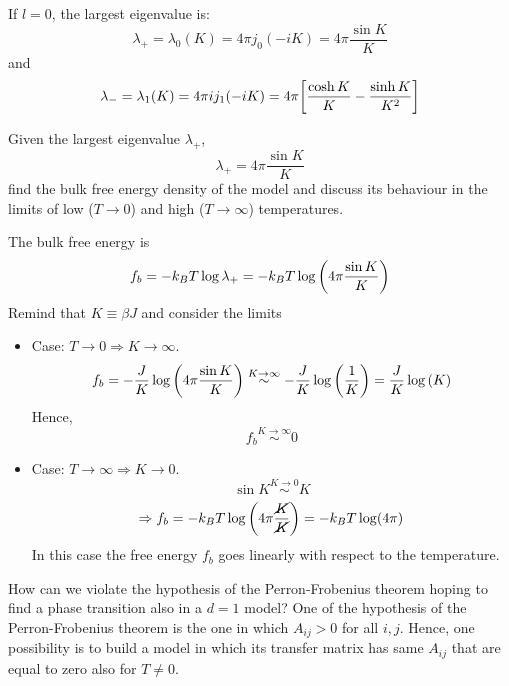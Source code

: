 \documentclass[../main/main.tex]{subfiles}
\begin{document}
If \( l=0 \), the largest eigenvalue is:
\begin{equation*}
  \lambda _+ = \lambda _0 (K) = 4 \pi j_0 (-iK) = 4 \pi \frac{\sin K }{K}
\end{equation*}
and
\begin{equation*}
  \lambda _- = \lambda _1 (K) = 4 \pi i j_1 (-iK) = 4 \pi \qty[\frac{\cosh K }{K}-\frac{\sinh K }{K^2}]
\end{equation*}

\begin{exercise}{}{}
Given the largest eigenvalue \( \lambda _+ \),
\begin{equation*}
  \lambda _+ = 4 \pi \frac{\sin K }{K}
\end{equation*}
find the bulk free energy density of the model and discuss its behaviour in the limits of low (\( T \rightarrow 0 \)) and high (\( T \rightarrow \infty  \)) temperatures.
\begin{solution}
The bulk free energy is 
\begin{equation*}
    f_b = -k_B T \log \lambda_+ = -k_B T \log \qty(  4 \pi \frac{\sin K }{K} )
\end{equation*}
Remind that \( K \equiv \beta J \) and consider the limits
\begin{itemize}
    \item Case: \( T \rightarrow 0 \Rightarrow K \rightarrow \infty \).
    \begin{equation*}
       f_b = - \frac{J}{K} \log \qty(  4 \pi \frac{\sin K }{K} )
        \overset{K \rightarrow \infty}{\sim}
        - \frac{J}{K}   \log \qty(  \frac{1}{K} )
        = \frac{J}{K}   \log \qty(  K )
    \end{equation*}    
    Hence,
    \begin{equation*}
       f_b \overset{K \rightarrow \infty}{\sim} 0
    \end{equation*}      
    \item Case: \( T \rightarrow \infty \Rightarrow K \rightarrow 0 \).
    \begin{equation*}
        \sin K \overset{K \rightarrow 0}{\sim} K
    \end{equation*}
    \begin{equation*}
        \Rightarrow f_b = - k_B T \log \qty(  4 \pi \frac{ \cancel{K} }{\cancel{K}} ) = - k_B T \log (4 \pi)
    \end{equation*}
    In this case the free energy \(f_b\) goes linearly with respect to the temperature.
\end{itemize}

\end{solution}
\end{exercise}


How can we violate the hypothesis of the Perron-Frobenius theorem hoping to find a phase transition also in a \( d=1 \) model?
 One of the hypothesis of the Perron-Frobenius theorem is the one in which \( A_{ij}>0  \) for all \(i,j \). Hence, one possibility is to build a model in which its transfer matrix has same \( A_{ij} \) that are equal to zero also for \( T \neq 0 \).
\end{document}
